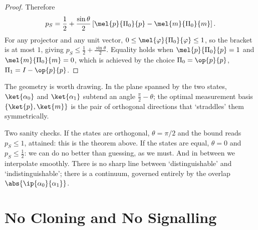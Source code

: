 \begin{proof}
	Therefore
	$$p_S = \frac12 + \frac{\sin\theta}{2}\left[\mel{p}{\Pi_0}{p} - \mel{m}{\Pi_0}{m}\right].$$
	For any projector and any unit vector, $0 \leq \mel{\varphi}{\Pi_0}{\varphi} \leq 1$, so the bracket is at most $1$, giving $p_S \leq \tfrac12 + \tfrac{\sin\theta}{2}$. Equality holds when $\mel{p}{\Pi_0}{p} = 1$ and $\mel{m}{\Pi_0}{m} = 0$, which is achieved by the choice $\Pi_0 = \op{p}{p}$, $\Pi_1 = I - \op{p}{p}$.
\end{proof}

The geometry is worth drawing. In the plane spanned by the two states, $\ket{\alpha_0}$ and $\ket{\alpha_1}$ subtend an angle $\tfrac{\pi}{2} - \theta$; the optimal measurement basis $\{\ket{p},\ket{m}\}$ is the pair of orthogonal directions that `straddles' them symmetrically.

\begin{center}
\end{center}

Two sanity checks. If the states are orthogonal, $\theta = \pi/2$ and the bound reads $p_S \le 1$, attained: this is the theorem above. If the states are equal, $\theta = 0$ and $p_S \leq \tfrac12$: we can do no better than guessing, as we must. And in between we interpolate smoothly. There is no sharp line between `distinguishable' and `indistinguishable'; there is a continuum, governed entirely by the overlap $\abs{\ip{\alpha_0}{\alpha_1}}$.

\section{No Cloning and No Signalling}

